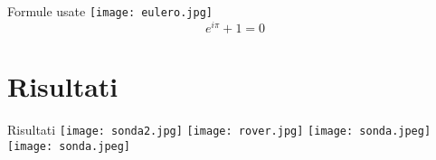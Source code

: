 \documentclass{beamer}
\begin{document}
\begin{frame}{Formule usate}
 \texttt{[image: eulero.jpg]}
 \centering
\begin{equation}
   e^{i \pi} + 1 = 0
\end{equation}
\end{frame}

\section{Risultati}

\begin{frame}{Risultati}
 \texttt{[image: sonda2.jpg]}
 \texttt{[image: rover.jpg]} 
 \texttt{[image: sonda.jpeg]}
 \texttt{[image: sonda.jpeg]} 
 \centering
\end{frame}
\end{document}
